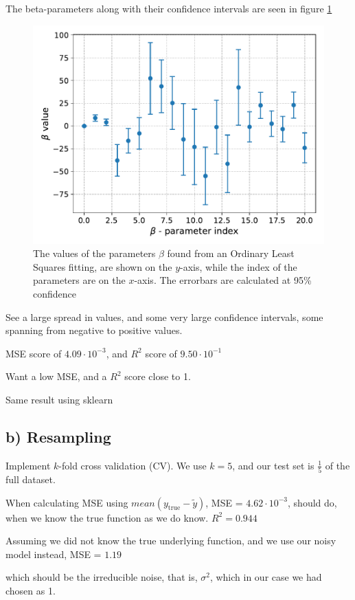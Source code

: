 \documentclass[a4paper,10pt,english]{article}
\begin{document}
The beta-parameters along with their confidence intervals are seen in figure \ref{fig:1}
\begin{figure}[H]
	\centering
	\includegraphics[scale=0.7]{a_CI_betaOLS.pdf}
	\caption{The values of the parameters $\beta$ found from an Ordinary Least Squares fitting, are shown on the $y$-axis, while the index of the parameters are on the $x$-axis. The errorbars are calculated at 95\% confidence}
	\label{fig:1}
\end{figure}

See a large spread in values, and some very large confidence intervals, some spanning from negative to positive values.

MSE score of $4.09\cdot 10 ^{-3}$, and $R^2$ score of $9.50\cdot10^{-1}$

Want a low MSE, and a $R^2$ score close to 1.

Same result using sklearn

\subsection{b) Resampling}
Implement $k$-fold cross validation (CV). We use $k=5$, and our test set is $\frac{1}{5}$ of the full dataset.

When calculating MSE using $mean(y_\mathrm{true}-\tilde y)$,
MSE = $4.62\cdot 10^{-3}$, should do, when we know the true function as we do know. $R^2= 0.944$

Assuming we did not know the true underlying function, and we use our noisy model instead,
MSE = $1.19$

which should be the irreducible noise, that is, $\sigma^2$, which in our case we had chosen as 1.
\end{document}

